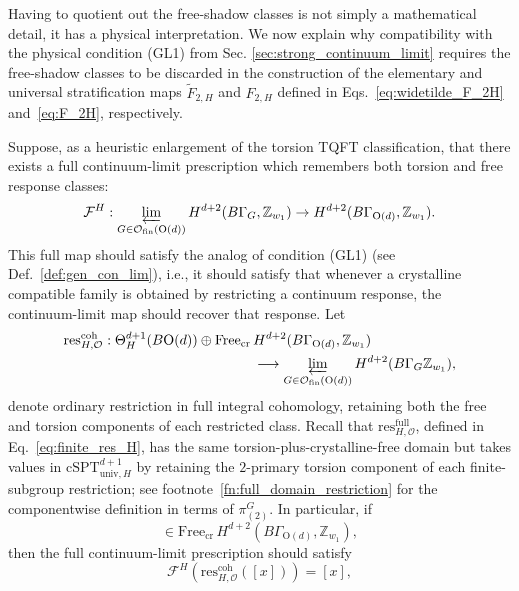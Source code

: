 \documentclass[aps,prx,reprint,superscriptaddress,twocolumn,amsmath,amssymb,amsfonts, nofootinbib]{revtex4-2}
\newcommand{\ofin}{\mathcal{O}_{\text{fin}}}
\newcommand{\res}{\text{res}}
\newcommand{\Z}{\mathbb{Z}}
\theoremstyle{apsstyle}
\begin{document}
Having to quotient out the free-shadow classes is not simply a mathematical detail, it has a physical interpretation. We now explain why compatibility with the physical condition {\rm(GL1)} from Sec. \ref{sec:strong_continuum_limit} requires the free-shadow classes to be discarded in the construction of the elementary and universal stratification maps $\widetilde F_{2,H}$ and $F_{2,H}$ defined in Eqs.~\eqref{eq:widetilde_F_2H} and~\eqref{eq:F_2H}, respectively.

Suppose, as a heuristic enlargement of the torsion TQFT classification, that there exists a full continuum-limit prescription which remembers both torsion and free response classes:
\begin{equation*}
    \mathcal{F}^{H}: \varprojlim_{G\in \ofin(\mathrm{O}(d))} H^{d+2}(B\Gamma_G, \Z_{w_{1}}) \to H^{d+2}(B\Gamma_{\mathrm{O}(d)}, \Z_{w_{1}}).
\end{equation*}
This full map should satisfy the analog of condition {\rm(GL1)} (see Def.~\ref{def:gen_con_lim}), i.e., it should satisfy that whenever a crystalline compatible family is obtained by restricting a continuum response, the continuum-limit map should recover that response. Let
\begin{align*}
\res_{H,\mathcal O}^{\mathrm{coh}}: \Theta^{d+1}_{H}(B\mathrm{O}(d)) \oplus
\mathrm{Free}_{\mathrm{cr}}\, &H^{d+2}(B\Gamma_{\mathrm{O}(d)},\Z_{w_1})\\
&\longrightarrow \varprojlim_{G\in\ofin(\mathrm{O}(d))} H^{d+2}(B\Gamma_G \Z_{w_1}),
\end{align*}
denote ordinary restriction in full integral cohomology, retaining both the free and torsion components of each restricted class. Recall that $\res^{\mathrm{full}}_{H,\mathcal O}$, defined in Eq.~\eqref{eq:finite_res_H}, has the same torsion-plus-crystalline-free domain but takes values in $\mathrm{cSPT}^{d+1}_{\mathrm{univ},H}$ by retaining the $2$-primary torsion component of each finite-subgroup restriction; see footnote~\ref{fn:full_domain_restriction} for the componentwise definition in terms of $\pi_{(2)}^{G}$.
In particular, if
\begin{equation*}
[x]\in \mathrm{Free}_{\mathrm{cr}}\, H^{d+2}(B\Gamma_{\mathrm{O}(d)},\Z_{w_1}),
\end{equation*}
then the full continuum-limit prescription should satisfy
\begin{equation*}
\mathcal F^H\left( \res_{H,\mathcal O}^{\mathrm{coh}}([x]) \right) = [x],
\end{equation*}
\end{document}
